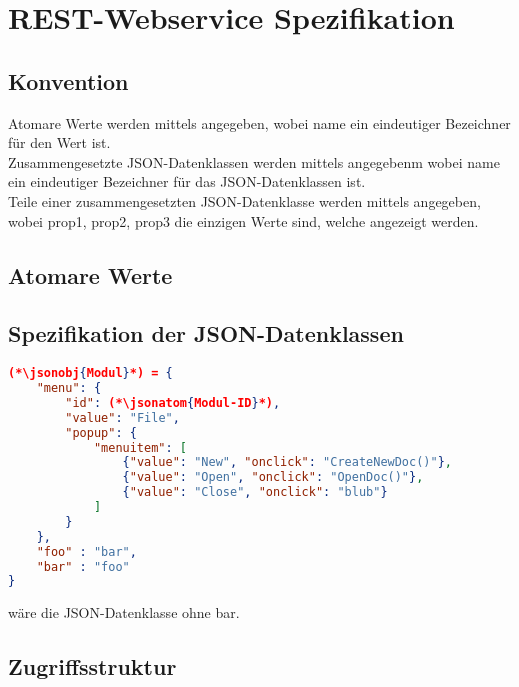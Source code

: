 \section{REST-Webservice Spezifikation}
\subsection{Konvention}
Atomare Werte werden mittels  angegeben, wobei name ein eindeutiger Bezeichner für den Wert ist.\\
Zusammengesetzte JSON-Datenklassen werden mittels  angegebenm wobei name ein eindeutiger Bezeichner für das JSON-Datenklassen ist.\\
Teile einer zusammengesetzten JSON-Datenklasse werden mittels  angegeben, wobei prop1, prop2, prop3 die einzigen Werte sind, welche angezeigt werden.



\subsection{Atomare Werte}

\subsection{Spezifikation der JSON-Datenklassen}
\begin{lstlisting}[language=json,firstnumber=-3]
(*\jsonobj{Modul}*) = {
	"menu": {
		"id": (*\jsonatom{Modul-ID}*),
		"value": "File",
		"popup": {
			"menuitem": [
				{"value": "New", "onclick": "CreateNewDoc()"},
				{"value": "Open", "onclick": "OpenDoc()"},
				{"value": "Close", "onclick": "blub"}
			]
		}
	},
	"foo" : "bar",
	"bar" : "foo"
}
\end{lstlisting}
 wäre die JSON-Datenklasse  ohne bar.
\subsection{Zugriffsstruktur}

